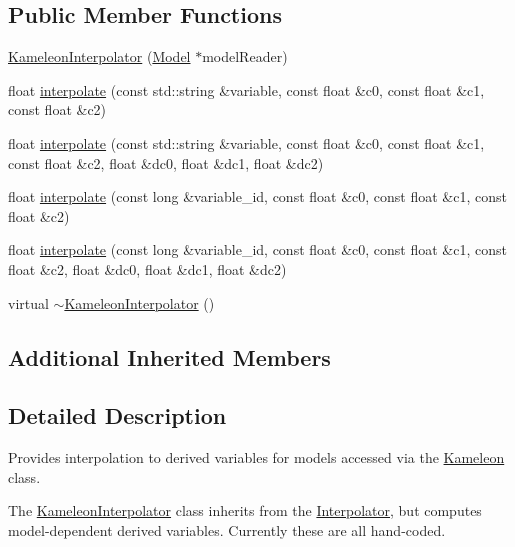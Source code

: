 \subsection*{Public Member Functions}
\begin{DoxyCompactItemize}
\item 
\hyperlink{classccmc_1_1_kameleon_interpolator_af0dcfbe00759f2e23f508dc1e86f34c0}{Kameleon\-Interpolator} (\hyperlink{classccmc_1_1_model}{Model} $\ast$model\-Reader)
\item 
float \hyperlink{classccmc_1_1_kameleon_interpolator_af1b8a5dcd9ab7a02286f665f941f23f5}{interpolate} (const std\-::string \&variable, const float \&c0, const float \&c1, const float \&c2)
\item 
float \hyperlink{classccmc_1_1_kameleon_interpolator_ac0f406b8da511a973a1d86409eb389d6}{interpolate} (const std\-::string \&variable, const float \&c0, const float \&c1, const float \&c2, float \&dc0, float \&dc1, float \&dc2)
\item 
float \hyperlink{classccmc_1_1_kameleon_interpolator_ab20ef65c8a089ce4ceef8c888272f0f9}{interpolate} (const long \&variable\-\_\-id, const float \&c0, const float \&c1, const float \&c2)
\item 
float \hyperlink{classccmc_1_1_kameleon_interpolator_a510590ccb55b491c9105a9c5db91cd42}{interpolate} (const long \&variable\-\_\-id, const float \&c0, const float \&c1, const float \&c2, float \&dc0, float \&dc1, float \&dc2)
\item 
virtual \hyperlink{classccmc_1_1_kameleon_interpolator_af873131cb1952d8bec2c77df753e8dcb}{$\sim$\-Kameleon\-Interpolator} ()
\end{DoxyCompactItemize}
\subsection*{Additional Inherited Members}


\subsection{Detailed Description}
Provides interpolation to derived variables for models accessed via the \hyperlink{classccmc_1_1_kameleon}{Kameleon} class. 

The \hyperlink{classccmc_1_1_kameleon_interpolator}{Kameleon\-Interpolator} class inherits from the \hyperlink{classccmc_1_1_interpolator}{Interpolator}, but computes model-\/dependent derived variables. Currently these are all hand-\/coded. 

